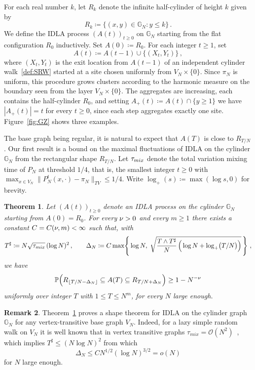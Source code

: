 \documentclass[11pt,a4paper,reqno]{amsart}
\newtheorem{Theorem}{Theorem}[section]
\theoremstyle{definition}
\newtheorem{Remark}[Theorem]{Remark}
\newcommand{\bbG}{{\ensuremath{\mathbb G}} }
\newcommand{\bbP}{{\ensuremath{\mathbb P}} }
\begin{document}
For each real number $k$, let $R_k$ denote the infinite half-cylinder of height $k$ given by
	\[ R_k \coloneqq \{ (x,y) \in \bbG_N : y \leq k \}\,. \]
We define the IDLA process $(A(t))_{t \geq 0}$ on $\bbG_N$ starting from the flat configuration $R_0$ inductively. Set $A(0) \coloneqq R_0$. For each integer $t \geq 1$, set
	\[ A(t) \coloneqq A(t-1) \cup \{ (X_{t} , Y_{t} ) \}\,, \]
where $(X_{t} , Y_{t})$ is the exit location from $A(t-1)$ of an independent cylinder walk~\eqref{def:SRW} started at a site chosen uniformly from $V_N \times \{0\}$. Since $\pi_N$ is uniform, this procedure grows clusters according to the harmonic measure on the boundary seen from the layer $V_N \times \{0\}$. The aggregates are increasing, each contains the half-cylinder $R_0$, and setting $A_+(t) \coloneqq A(t) \cap \{ y \geq 1\}$ we have $|A_+(t)| = t$ for every $t \geq 0$, since each step aggregates exactly one site. Figure~\ref{fig:GZ} shows three examples.


The base graph being regular, it is natural to expect that $A(T)$ is close to $R_{T/N}$. 
Our first result is a bound on the maximal fluctuations of IDLA on the cylinder $\bbG_N$ from the rectangular shape $R_{T/N}$. Let $\tau_{mix}$ denote the total variation mixing time of $P_N$ at threshold $1/4$, that is, the smallest integer $t \geq 0$ with $\max_{x \in V_N} \| P_N^t(x, \cdot) - \pi_N\|_{TV} \leq 1/4$.
Write $\log_+(s) \coloneqq \max(\log s, 0)$ for brevity. 
\begin{Theorem}\label{th:max_fluct}
Let $(A(t))_{t\geq 0}$ denote an IDLA process on the cylinder $\bbG_N$ starting from $A(0) = R_0$. For every $\nu > 0$ and every $m \geq 1$ there exists a constant $C = C(\nu, m) < \infty$ such that, with
	\[ T^\sharp \coloneqq N \sqrt{\tau_{mix}} \,(\log N)^2\,, \qquad \Delta_N \coloneqq C \max\!\left\{\, \log N,\; \sqrt{\frac{T \wedge T^\sharp}{N}\,\Big( \log N + \log_+\!\big( T/N \big) \Big)} \,\right\}\,, \]
we have
	\begin{equation}\label{eq:fluct}
	\bbP \Big( R_{\lfloor T/N - \Delta_N \rfloor}
	\subseteq A(T) \subseteq R_{T/N +  \Delta_N } \Big) \geq 1-N^{-\n}
	\end{equation}
uniformly over integer $T$ with $1 \leq T \leq N^m$, for every $N$ large enough. 
\end{Theorem}

\begin{Remark}\label{rem:shape_theorem}
Theorem~\ref{th:max_fluct} proves a shape theorem for IDLA on the cylinder graph $\bbG_N$ for any vertex-transitive base graph $V_N$. Indeed, for a lazy simple random walk on $V_N$ it is well known that 
in vertex transitive graphs
$\tau_{mix} = \mathcal{O} ( N^2)$~\cite[Corollary~13.24]{levin2017markov}, which implies $T^\sharp \leq (N \log N )^2$ from which
	\[ \Delta_N  \leq C N^{1/2} ( \log N )^{3/2} = o(N)  \]
for $N$ large enough.
\end{Remark}
\end{document}

